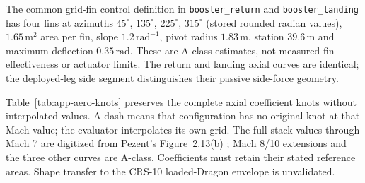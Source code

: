 The common grid-fin control definition in \texttt{booster\_return} and \texttt{booster\_landing} has four fins at azimuths $45^\circ$, $135^\circ$, $225^\circ$, $315^\circ$ (stored rounded radian values), $1.65\,\mathrm{m^2}$ area per fin, slope $1.2\,\mathrm{rad^{-1}}$, pivot radius $1.83\,\mathrm{m}$, station $39.6\,\mathrm{m}$ and maximum deflection $0.35\,\mathrm{rad}$. These are A-class estimates, not measured fin effectiveness or actuator limits. The return and landing axial curves are identical; the deployed-leg side segment distinguishes their passive side-force geometry.

Table~\ref{tab:app-aero-knots} preserves the complete axial coefficient knots without interpolated values. A dash means that configuration has no original knot at that Mach value; the evaluator interpolates its own grid. The full-stack values through Mach 7 are digitized from Pezent's Figure~2.13(b) \cite{pezent2024}; Mach 8/10 extensions and the three other curves are A-class. Coefficients must retain their stated reference areas. Shape transfer to the CRS-10 loaded-Dragon envelope is unvalidated.

